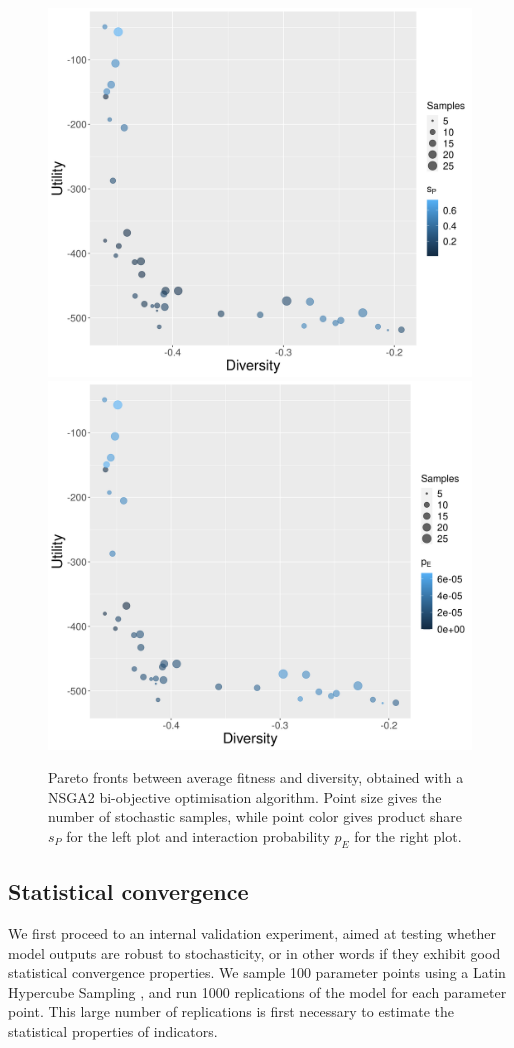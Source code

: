 \documentclass[letterpaper]{article}
\begin{document}
\begin{figure}[h!]
\begin{center}
\includegraphics[width=0.48\linewidth]{figures/paretoDiversity-Fitness_colorcurrentProductShare.png}
\includegraphics[width=0.48\linewidth]{figures/paretoDiversity-Fitness_colorinteractionProba.png}\\
\caption{Pareto fronts between average fitness and diversity, obtained with a NSGA2 bi-objective optimisation algorithm. Point size gives the number of stochastic samples, while point color gives product share $s_P$ for the left plot and interaction probability $p_E$ for the right plot.}
\label{fig:fig2}
\end{center}
\end{figure}


\subsection{Statistical convergence}

We first proceed to an internal validation experiment, aimed at testing whether model outputs are robust to stochasticity, or in other words if they exhibit good statistical convergence properties. We sample 100 parameter points using a Latin Hypercube Sampling \citep{giunta2003overview}, and run 1000 replications of the model for each parameter point. This large number of replications is first necessary to estimate the statistical properties of indicators.
\end{document}
